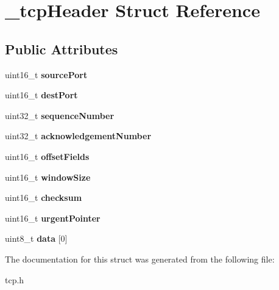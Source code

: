 \hypertarget{struct__tcpHeader}{}\section{\+\_\+tcp\+Header Struct Reference}
\label{struct__tcpHeader}
\subsection*{Public Attributes}
\begin{DoxyCompactItemize}
\item 
\mbox{\label{struct__tcpHeader_adab3cbb36f879d6bbb9511cbed24b7a5}} 
uint16\+\_\+t {\bfseries source\+Port}
\item 
\mbox{\label{struct__tcpHeader_a5484a2aa2e860b1f226a7014ae402d3e}} 
uint16\+\_\+t {\bfseries dest\+Port}
\item 
\mbox{\label{struct__tcpHeader_a5441a14212cd0e07d20b95ce8198db27}} 
uint32\+\_\+t {\bfseries sequence\+Number}
\item 
\mbox{\label{struct__tcpHeader_a99a7268547ba31c3fe8e44933d435389}} 
uint32\+\_\+t {\bfseries acknowledgement\+Number}
\item 
\mbox{\label{struct__tcpHeader_ad3fe63661ec8dea7e4a46bf010788384}} 
uint16\+\_\+t {\bfseries offset\+Fields}
\item 
\mbox{\label{struct__tcpHeader_ab3caec0ac5bef36c592a52b800f73e5b}} 
uint16\+\_\+t {\bfseries window\+Size}
\item 
\mbox{\label{struct__tcpHeader_a0906fe118aa70365e0820e171c75119b}} 
uint16\+\_\+t {\bfseries checksum}
\item 
\mbox{\label{struct__tcpHeader_a971349f17dd591d019c1e12c1454998f}} 
uint16\+\_\+t {\bfseries urgent\+Pointer}
\item 
\mbox{\label{struct__tcpHeader_aede9eb26ef4f1a85dc3491029ee4baac}} 
uint8\+\_\+t {\bfseries data} \mbox{[}0\mbox{]}
\end{DoxyCompactItemize}


The documentation for this struct was generated from the following file\+:\begin{DoxyCompactItemize}
\item 
tcp.\+h\end{DoxyCompactItemize}
